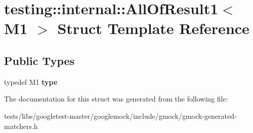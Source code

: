 \hypertarget{structtesting_1_1internal_1_1AllOfResult1}{}\section{testing\+:\+:internal\+:\+:All\+Of\+Result1$<$ M1 $>$ Struct Template Reference}
\label{structtesting_1_1internal_1_1AllOfResult1}
\subsection*{Public Types}
\begin{DoxyCompactItemize}
\item 
\mbox{\label{structtesting_1_1internal_1_1AllOfResult1_a19b95d4ddf7f4044a78665d9e253db10}} 
typedef M1 {\bfseries type}
\end{DoxyCompactItemize}


The documentation for this struct was generated from the following file\+:\begin{DoxyCompactItemize}
\item 
tests/libs/googletest-\/master/googlemock/include/gmock/gmock-\/generated-\/matchers.\+h\end{DoxyCompactItemize}
